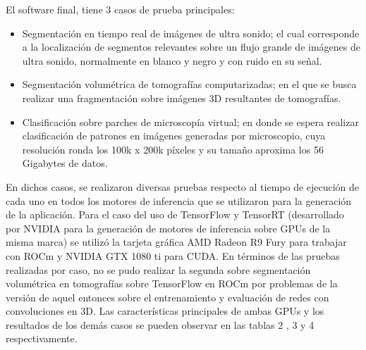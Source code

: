 El software final, tiene 3 casos de prueba principales:
\begin{itemize}
    \item Segmentación en tiempo real de imágenes de ultra sonido; el cual corresponde a la localización de segmentos relevantes sobre un flujo grande de imágenes de ultra sonido, normalmente en blanco y negro y con ruido en su señal.
    \item Segmentación volumétrica de tomografías computarizadas; en el que se busca realizar una fragmentación sobre imágenes 3D resultantes de tomografías.
    \item Clasificación sobre parches de microscopía virtual; en donde se espera realizar clasificación de patrones en imágenes generadas por microscopio, cuya resolución ronda los 100k x 200k píxeles y su tamaño aproxima los 56 Gigabytes de datos.
\end{itemize}

En dichos casos, se realizaron diversas pruebas respecto al tiempo de ejecución de cada uno en todos los motores de inferencia que se utilizaron para la generación de la aplicación. 
Para el caso del uso de TensorFlow y TensorRT (desarrollado por NVIDIA para la generación de motores de inferencia sobre GPUs de la misma marca) se utilizó la tarjeta gráfica AMD Radeon R9 Fury para trabajar con ROCm y NVIDIA GTX 1080 ti para CUDA. 
En términos de las pruebas realizadas por caso, no se pudo realizar la segunda sobre segmentación volumétrica en tomografías sobre TensorFlow en ROCm por problemas de la versión de aquel entonces sobre el entrenamiento y evaluación de redes con convoluciones en 3D.
Las características principales de ambas GPUs y los resultados de los demás casos se pueden observar en las tablas 2 , 3 y 4 respectivamente.

